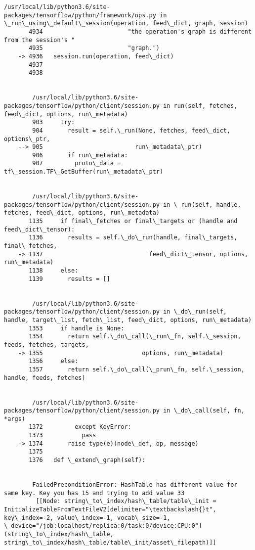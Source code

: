 \documentclass[11pt]{article}
\begin{document}
\begin{Verbatim}[commandchars=\\\{\}]
        /usr/local/lib/python3.6/site-packages/tensorflow/python/framework/ops.py in \_run\_using\_default\_session(operation, feed\_dict, graph, session)
       4934                        "the operation's graph is different from the session's "
       4935                        "graph.")
    -> 4936   session.run(operation, feed\_dict)
       4937 
       4938 


        /usr/local/lib/python3.6/site-packages/tensorflow/python/client/session.py in run(self, fetches, feed\_dict, options, run\_metadata)
        903     try:
        904       result = self.\_run(None, fetches, feed\_dict, options\_ptr,
    --> 905                          run\_metadata\_ptr)
        906       if run\_metadata:
        907         proto\_data = tf\_session.TF\_GetBuffer(run\_metadata\_ptr)


        /usr/local/lib/python3.6/site-packages/tensorflow/python/client/session.py in \_run(self, handle, fetches, feed\_dict, options, run\_metadata)
       1135     if final\_fetches or final\_targets or (handle and feed\_dict\_tensor):
       1136       results = self.\_do\_run(handle, final\_targets, final\_fetches,
    -> 1137                              feed\_dict\_tensor, options, run\_metadata)
       1138     else:
       1139       results = []


        /usr/local/lib/python3.6/site-packages/tensorflow/python/client/session.py in \_do\_run(self, handle, target\_list, fetch\_list, feed\_dict, options, run\_metadata)
       1353     if handle is None:
       1354       return self.\_do\_call(\_run\_fn, self.\_session, feeds, fetches, targets,
    -> 1355                            options, run\_metadata)
       1356     else:
       1357       return self.\_do\_call(\_prun\_fn, self.\_session, handle, feeds, fetches)


        /usr/local/lib/python3.6/site-packages/tensorflow/python/client/session.py in \_do\_call(self, fn, *args)
       1372         except KeyError:
       1373           pass
    -> 1374       raise type(e)(node\_def, op, message)
       1375 
       1376   def \_extend\_graph(self):


        FailedPreconditionError: HashTable has different value for same key. Key you has 15 and trying to add value 33
    	 [[Node: string\_to\_index/hash\_table/table\_init = InitializeTableFromTextFileV2[delimiter="\textbackslash{}t", key\_index=-2, value\_index=-1, vocab\_size=-1, \_device="/job:localhost/replica:0/task:0/device:CPU:0"](string\_to\_index/hash\_table, string\_to\_index/hash\_table/table\_init/asset\_filepath)]]
    

\end{Verbatim}
\end{document}
